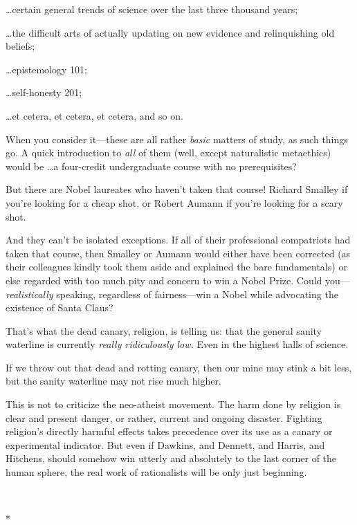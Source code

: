 {
 \ldots certain general trends of science over the last three
thousand years;}

{
 \ldots the difficult arts of actually updating on new evidence and
relinquishing old beliefs;}

{
 \ldots epistemology 101;}

{
 \ldots self-honesty 201;}

{
 \ldots et cetera, et cetera, et cetera, and so on.}

{
 When you consider it---these are all rather \textit{basic} matters
of study, as such things go. A quick introduction to \textit{all} of
them (well, except naturalistic metaethics) would be \ldots a
four-credit undergraduate course with no prerequisites?}

{
 But there are Nobel laureates who haven't taken
that course! Richard Smalley if you're looking for a
cheap shot, or Robert Aumann if you're looking for a
scary shot.}

{
 And they can't be isolated exceptions. If all of
their professional compatriots had taken that course, then Smalley or
Aumann would either have been corrected (as their colleagues kindly
took them aside and explained the bare fundamentals) or else regarded
with too much pity and concern to win a Nobel Prize. Could
you---\textit{realistically} speaking, regardless of fairness---win a
Nobel while advocating the existence of Santa Claus?}

{
 That's what the dead canary, religion, is telling
us: that the general sanity waterline is currently \textit{really
ridiculously low.} Even in the highest halls of science.}

{
 If we throw out that dead and rotting canary, then our mine may
stink a bit less, but the sanity waterline may not rise much higher.}

{
 This is not to criticize the neo-atheist movement. The harm done
by religion is clear and present danger, or rather, current and ongoing
disaster. Fighting religion's directly harmful effects
takes precedence over its use as a canary or experimental indicator.
But even if Dawkins, and Dennett, and Harris, and Hitchens, should
somehow win utterly and absolutely to the last corner of the human
sphere, the real work of rationalists will be only just beginning.}

{\centering
 \ ~
\par}

{\centering
 *
\par}

